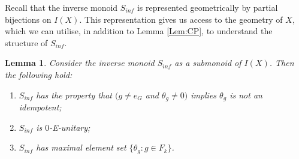 \documentclass[11pt]{amsart}
\theoremstyle{plain}
\newtheorem{lemma}[theorem]{Lemma}%
\theoremstyle{definition}%
\theoremstyle{remark}%
\begin{document}
Recall that the inverse monoid $S_{inf}$ is represented geometrically by partial bijections on $I(X)$. This representation gives us access to the geometry of $X$, which we can utilise, in addition to Lemma \ref{Lem:CP}, to understand the structure of $S_{inf}$. 

\begin{lemma}
Consider the inverse monoid $S_{inf}$ as a submonoid of $I(X)$. Then the following hold:
\begin{enumerate}
\item $S_{inf}$ has the property that $(g\not = e_{G}$ and $\theta_{g}\not = 0)$ implies $\theta_{g}$ is not an idempotent; 
\item $S_{inf}$ is $0$-E-unitary;
\item $S_{inf}$ has maximal element set $\lbrace \theta_{g} : g \in F_{k} \rbrace$.
\end{enumerate}
\end{lemma}
\end{document}
